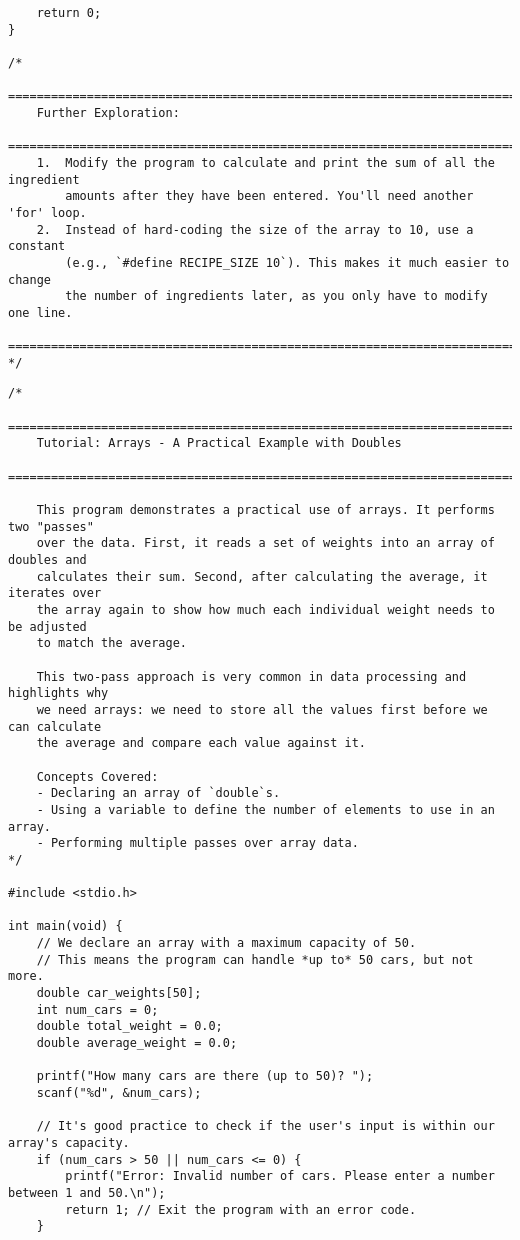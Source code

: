 \documentclass[11pt]{book}
\begin{document}
\begin{verbatim}
    return 0;
}

/*
    ================================================================================
    Further Exploration:
    ================================================================================
    1.  Modify the program to calculate and print the sum of all the ingredient
        amounts after they have been entered. You'll need another 'for' loop.
    2.  Instead of hard-coding the size of the array to 10, use a constant
        (e.g., `#define RECIPE_SIZE 10`). This makes it much easier to change
        the number of ingredients later, as you only have to modify one line.
    ================================================================================
*/

\end{verbatim}
\clearpage
\begin{verbatim}
/*
    ================================================================================
    Tutorial: Arrays - A Practical Example with Doubles
    ================================================================================

    This program demonstrates a practical use of arrays. It performs two "passes"
    over the data. First, it reads a set of weights into an array of doubles and
    calculates their sum. Second, after calculating the average, it iterates over
    the array again to show how much each individual weight needs to be adjusted
    to match the average.

    This two-pass approach is very common in data processing and highlights why
    we need arrays: we need to store all the values first before we can calculate
    the average and compare each value against it.

    Concepts Covered:
    - Declaring an array of `double`s.
    - Using a variable to define the number of elements to use in an array.
    - Performing multiple passes over array data.
*/

#include <stdio.h>

int main(void) {
    // We declare an array with a maximum capacity of 50.
    // This means the program can handle *up to* 50 cars, but not more.
    double car_weights[50];
    int num_cars = 0;
    double total_weight = 0.0;
    double average_weight = 0.0;

    printf("How many cars are there (up to 50)? ");
    scanf("%d", &num_cars);

    // It's good practice to check if the user's input is within our array's capacity.
    if (num_cars > 50 || num_cars <= 0) {
        printf("Error: Invalid number of cars. Please enter a number between 1 and 50.\n");
        return 1; // Exit the program with an error code.
    }


\end{verbatim}
\end{document}
